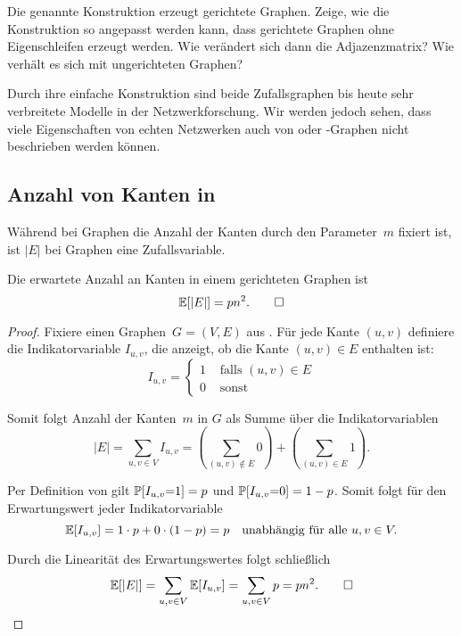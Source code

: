 \begin{exercise}
    Die genannte Konstruktion erzeugt gerichtete Graphen.
    Zeige, wie die Konstruktion so angepasst werden kann, dass gerichtete Graphen ohne Eigenschleifen erzeugt werden.
    Wie verändert sich dann die Adjazenzmatrix?
    Wie verhält es sich mit ungerichteten Graphen?
\end{exercise}

Durch ihre einfache Konstruktion sind beide Zufallsgraphen bis heute sehr verbreitete Modelle in der Netzwerkforschung.
Wir werden jedoch sehen, dass viele Eigenschaften von echten Netzwerken auch von \Gnp oder \Gnm-Graphen nicht beschrieben werden können.

\subsection{Anzahl von Kanten in \Gnp}
Während bei \Gnm Graphen die Anzahl der Kanten durch den Parameter~$m$ fixiert ist, ist $|E|$ bei \Gnp Graphen eine Zufallsvariable.

\begin{lemma}\label{lemma:erwartete_kanten_in_gnp}
    Die  erwartete Anzahl an Kanten in einem gerichteten \Gnp Graphen ist \begin{equation*} \mathbb{E}\!\left[|E|\right] = p n^2. \qedhere \end{equation*}
\end{lemma}

\begin{proof}
    Fixiere einen Graphen~$G=(V,E)$ aus \Gnp.
    Für jede Kante $(u,v)$ definiere die Indikatorvariable $I_{u,v}$, die anzeigt, ob die Kante $(u,v) \in E$ enthalten ist:
    \begin{equation}
        I_{u,v} = \begin{cases}
            1 & \text{ falls } (u,v) \in E \\
            0 & \text{ sonst }
        \end{cases}
    \end{equation}

    \noindent Somit folgt Anzahl der Kanten~$m$ in $G$ als Summe über die Indikatorvariablen
    \begin{equation}
        |E| = \sum_{u,v \in V} I_{u,v} = \left(\sum_{(u,v) \not\in E} 0 \right) +  \left(\sum_{(u,v) \in E} 1\right).
    \end{equation}

    \noindent Per Definition von \Gnp gilt $\mathbb{P}\!\left[I_{u,v} {=} 1\right] = p$ und $\mathbb{P}\!\left[I_{u,v} {=} 0\right] = 1-p$.
    Somit folgt für den Erwartungswert jeder Indikatorvariable
    \begin{equation}
        \mathbb{E}\!\left[I_{u,v}\right] = 1 \cdot p + 0 \cdot (1-p) = p \quad \text{unabhängig für alle } u, v \in V.
    \end{equation}

    \noindent Durch die Linearität des Erwartungswertes folgt schließlich
    \begin{equation}
        \mathbb{E}\!\left[|E|\right] = \sum_{u,v \in V} \mathbb{E}\!\left[I_{u,v}\right] = \sum_{u,v \in V} p = p n^2. \qedhere
    \end{equation}
\end{proof}

